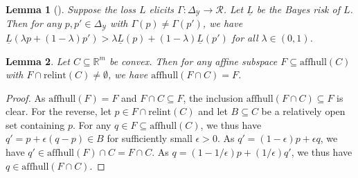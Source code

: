 \documentclass{article}
\newcommand{\Comments}{1}
\newcommand{\mynote}[2]{\ifnum\Comments=1\textcolor{#1}{#2}\fi}
\newcommand{\raf}[1]{\mynote{green!80!blue}{[RF: #1]}}
\newcommand{\reals}{\mathbb{R}}
\newcommand{\simplex}{\Delta_\Y}
\newcommand{\relint}[1]{\mathrm{relint}(#1)}
\newcommand{\affhull}{\mathrm{affhull}}
\newcommand{\R}{\mathcal{R}}
\newcommand{\Y}{\mathcal{Y}}
\newtheorem{lemma}{Lemma}
\begin{document}
\newcommand{\lbar}{\underline{L}} %
\newcommand{\iden}{\mathrm{iden}}
\newcommand{\Var}{\mathrm{Var}}

\begin{lemma}[\citep{frongillo2018elicitation}]
  \label{lem:elic-complex-bayes-concave}
  Suppose the loss $L$ elicits $\Gamma:\simplex\to\R$.
  Let $\lbar$ be the Bayes risk of $L$.
  Then for any $p,p'\in\simplex$ with $\Gamma(p)\neq\Gamma(p')$, we have $\lbar(\lambda p + (1-\lambda) p') > \lambda \lbar(p) + (1-\lambda) \lbar(p')$ for all $\lambda\in(0,1)$.
\end{lemma}


\begin{lemma}\label{lem:affhull-relint}
  Let $C\subseteq\reals^m$ be convex.
  Then for any affine subspace $F\subseteq\affhull(C)$ with $F\cap\relint C \neq \emptyset$, we have $\affhull(F\cap C) = F$.
\end{lemma}
\begin{proof}
  As $\affhull(F) = F$ and $F\cap C\subseteq F$, the inclusion $\affhull(F\cap C) \subseteq F$ is clear.
  For the reverse, let $p\in F\cap\relint C$ and let $B\subseteq C$ be a relatively open set containing $p$.
  For any $q\in F \subseteq \affhull(C)$, we thus have $q' = p + \epsilon (q-p) \in B$ for sufficiently small $\epsilon > 0$.
  As $q' = (1-\epsilon) p + \epsilon q$, we have $q' \in \affhull(F)\cap C = F\cap C$.
  As $q = (1-1/\epsilon) p + (1/\epsilon) q'$, we thus have $q\in\affhull(F\cap C)$.
\end{proof}
\end{document}
